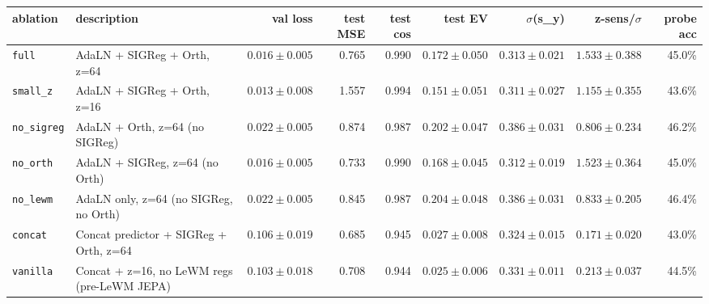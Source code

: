 \begin{tabular}{llrrrrrrr}
\toprule
ablation & description & val loss & test MSE & test cos & test EV & $\sigma$(s_y) & z-sens/$\sigma$ & probe acc \\
\midrule
\texttt{full} & AdaLN + SIGReg + Orth, z=64 & $0.016 \pm 0.005$ & 0.765 & 0.990 & $0.172 \pm 0.050$ & $0.313 \pm 0.021$ & $1.533 \pm 0.388$ & 45.0\% \\
\texttt{small\_z} & AdaLN + SIGReg + Orth, z=16 & $0.013 \pm 0.008$ & 1.557 & 0.994 & $0.151 \pm 0.051$ & $0.311 \pm 0.027$ & $1.155 \pm 0.355$ & 43.6\% \\
\texttt{no\_sigreg} & AdaLN + Orth, z=64 (no SIGReg) & $0.022 \pm 0.005$ & 0.874 & 0.987 & $0.202 \pm 0.047$ & $0.386 \pm 0.031$ & $0.806 \pm 0.234$ & 46.2\% \\
\texttt{no\_orth} & AdaLN + SIGReg, z=64 (no Orth) & $0.016 \pm 0.005$ & 0.733 & 0.990 & $0.168 \pm 0.045$ & $0.312 \pm 0.019$ & $1.523 \pm 0.364$ & 45.0\% \\
\texttt{no\_lewm} & AdaLN only, z=64 (no SIGReg, no Orth) & $0.022 \pm 0.005$ & 0.845 & 0.987 & $0.204 \pm 0.048$ & $0.386 \pm 0.031$ & $0.833 \pm 0.205$ & 46.4\% \\
\texttt{concat} & Concat predictor + SIGReg + Orth, z=64 & $0.106 \pm 0.019$ & 0.685 & 0.945 & $0.027 \pm 0.008$ & $0.324 \pm 0.015$ & $0.171 \pm 0.020$ & 43.0\% \\
\texttt{vanilla} & Concat + z=16, no LeWM regs (pre-LeWM JEPA) & $0.103 \pm 0.018$ & 0.708 & 0.944 & $0.025 \pm 0.006$ & $0.331 \pm 0.011$ & $0.213 \pm 0.037$ & 44.5\% \\
\bottomrule
\end{tabular}
